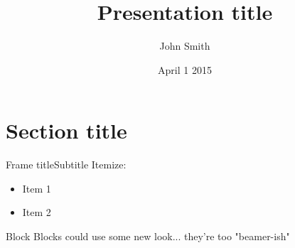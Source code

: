 \documentclass[xcolor=rgb]{beamer}
\title{Presentation title}
\author{John Smith}
\institute{University of College}
\date{April 1 2015}
\begin{document}
\maketitle

\section{Section title}

\begin{frame}{Frame title}{Subtitle}
  Itemize:
  \begin{itemize}
  \item Item 1
  \item Item 2
  \end{itemize}

  \begin{block}{Block}
    Blocks could use some new look... they're too "beamer-ish"
  \end{block}
\end{frame}
\end{document}
